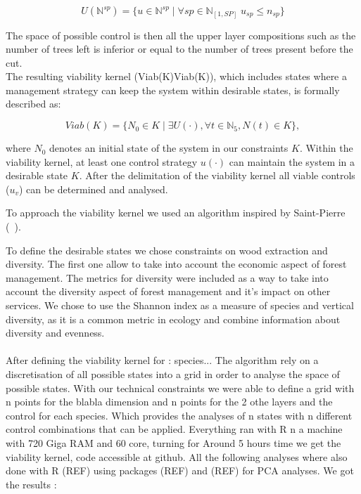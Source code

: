\documentclass{article}
\begin{document}
\begin{equation}
     U(\mathbb{N}^{sp}) = \{u \in \mathbb{N}^{sp} \mid \forall sp \in \mathbb{N}_{[1,SP]} \; u_{sp} \leq n_{sp}\}
\end{equation}

The space of possible control is then all the upper layer compositions such as the number of trees left is inferior or equal to the number of trees present before the cut.\\

The resulting viability kernel (Viab(K)Viab(K)), which includes states where a management strategy can keep the system within desirable states, is formally described as:

\begin{equation}
    Viab(K) = \{N_0 \in K \mid\exists U(\cdot), \forall t \in \mathbb{N}_5, N(t) \in K\},
\end{equation}

where \(N_0\) denotes an initial state of the system in our constraints $K$. Within the viability kernel, at least one control strategy $u(\cdot)$ can maintain the system in a desirable state $K$. After the delimitation of the viability kernel all viable controls (\(u_v\)) can be determined and analysed.

To approach the viability kernel we used an algorithm inspired by Saint-Pierre (~\autocite{saint-pierreApproximationViabilityKernel1994}).

To define the desirable states we chose constraints on wood extraction and diversity. The first one allow to take into account the economic aspect of forest management. The metrics for diversity were included as a way to take into account the diversity aspect of forest management and it's impact on other services. We chose to use the Shannon index as a measure of species and vertical diversity, as it is a common metric in ecology and combine information about diversity and evenness. \\
\\

After defining the viability kernel for : species...
The algorithm rely on a discretisation of all possible states into a grid in order to analyse the space of possible states. With our technical constraints we were able to define a grid with n points for the blabla dimension and n points for the 2 othe layers and the control for each species. Which provides the analyses of n states with n different control combinations that can be applied.
Everything ran with R n a machine with 720 Giga RAM and 60 core, turning for Around 5 hours time we get the viability kernel, code accessible at github. All the following analyses where also done with R (REF) using packages (REF) and (REF) for PCA analyses.
We got the results :
\end{document}
